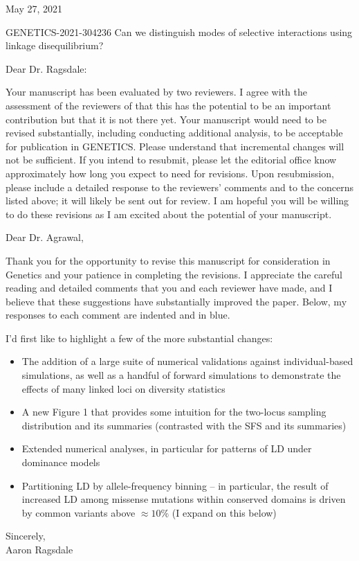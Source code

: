\documentclass{article}
\newenvironment{response}%
  {\list{}{\leftmargin=0.5in\rightmargin=0.5in\color{blue}}\item[]}%
  {\endlist}
\begin{document}
May 27, 2021

GENETICS-2021-304236
Can we distinguish modes of selective interactions using linkage disequilibrium?

Dear Dr. Ragsdale:

Your manuscript has been evaluated by two reviewers.  I agree with the
assessment of the reviewers of that this has the potential to be an important
contribution but that it is not there yet.  Your manuscript would need to be
revised substantially, including conducting additional analysis, to be
acceptable for publication in GENETICS.  Please understand that incremental
changes will not be sufficient.  If you intend to resubmit, please let the
editorial office know approximately how long you expect to need for revisions.
Upon resubmission, please include a detailed response to the reviewers'
comments and to the concerns listed above; it will likely be sent out for
review.  I am hopeful you will be willing to do these revisions as I am excited
about the potential of your manuscript.

\begin{response}
    Dear Dr. Agrawal,

    Thank you for the opportunity to revise this manuscript for consideration
    in Genetics and your patience in completing the revisions. I appreciate
    the careful reading and detailed comments that you and each reviewer have
    made, and I believe that these suggestions have substantially improved the
    paper. Below, my responses to each comment are indented and in blue.

    I'd first like to highlight a few of the more substantial changes:
    \begin{itemize}
        \item The addition of a large suite of numerical validations against
            individual-based simulations, as well as a handful of forward
            simulations to demonstrate the effects of many linked loci on diversity
            statistics
        \item A new Figure 1 that provides some intuition for the two-locus
            sampling distribution and its summaries (contrasted with the SFS
            and its summaries)
        \item Extended numerical analyses, in particular for patterns of LD under
            dominance models
        \item Partitioning LD by allele-frequency binning -- in particular, the
            result of increased LD among missense mutations within conserved
            domains is driven by common variants above $\approx 10\%$
            (I expand on this below)
    \end{itemize}

    \noindent
    Sincerely,\\
    Aaron Ragsdale
\end{response}
\end{document}
